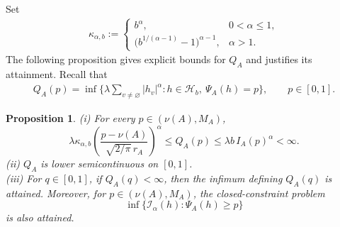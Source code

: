 \documentclass[a4paper, 11pt]{article}
\newcommand{\1}{\mathbf 1}
\theoremstyle{plain}
\newtheorem{proposition}[theorem]{Proposition}
\begin{document}
\par
Set
\begin{align}\label{rggbtht5}
  \kappa_{\alpha,b}
  :=
  \begin{cases}
    b^\alpha,&0<\alpha\leq1,\\[0.3em]
    \bigl(b^{1/(\alpha-1)}-1\bigr)^{\alpha-1},&\alpha>1.
  \end{cases}
\end{align}
The following proposition gives explicit bounds for $Q_A$ and justifies its attainment. Recall that
\begin{align}\label{5tgtwg5gyh}
  Q_A(p)
  =
  \inf\Big\{\lambda\sum_{v\neq\varnothing}|h_v|^\alpha:h\in\mathcal{H}_b,\ \Psi_A(h)=p\Big\},
  \qquad p\in[0,1].
\end{align}
\begin{proposition}
\label{prop:cost-bounds}
(i) For every \(p\in(\nu(A),M_A)\),
\begin{equation}\label{eq:explicit-Q-bounds}
  \lambda\kappa_{\alpha,b}
  \left(
    \frac{p-\nu(A)}
    {\sqrt{2/\pi}\,r_A}
  \right)^\alpha
  \leq
  Q_A(p)
  \leq
  \lambda b\,I_A(p)^\alpha
  <\infty.
\end{equation}
(ii) $Q_A$ is lower semicontinuous on $[0,1]$.\\
(iii) For $q\in[0,1]$, if \(Q_A(q)<\infty\), then the infimum defining \(Q_A(q)\) is
attained. Moreover, for \(p\in(\nu(A),M_A)\), the closed-constraint problem
\[
  \inf\{\mathcal{I_{\alpha}}(h):\Psi_A(h)\geq p\}
\]
is also attained.
\end{proposition}
\end{document}

